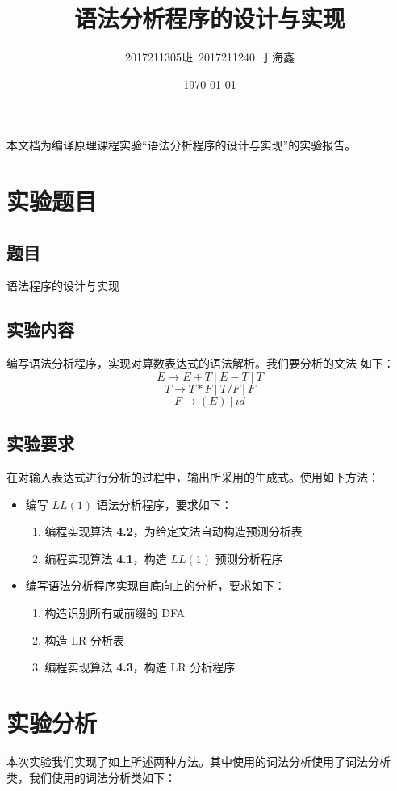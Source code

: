 \documentclass[blue,normal,cn]{elegantnote}
\title{语法分析程序的设计与实现}
\date{\today}
\author{2017211305班\ 2017211240\ 于海鑫}
\begin{document}
\maketitle
本文档为编译原理课程实验``语法分析程序的设计与实现''的实验报告。

\section{实验题目}
\subsection{题目}
语法程序的设计与实现
\subsection{实验内容}
编写语法分析程序，实现对算数表达式的语法解析。我们要分析的文法
如下：
$$
E \to E + T \ |\  E - T\ |\  T
$$
$$
T \to T * F \ |\  T / F\ |\  F
$$
$$
F \to (E) \ |\  id
$$
\subsection{实验要求}
在对输入表达式进行分析的过程中，输出所采用的生成式。使用如下方法：
\begin{itemize}
	\item 编写 $LL(1)$ 语法分析程序，要求如下：
	\begin{enumerate}
		\item 编程实现算法 \textbf{4.2}，为给定文法自动构造预测分析表
		\item 编程实现算法 \textbf{4.1}，构造 $LL(1)$ 预测分析程序
	\end{enumerate}
	\item 编写语法分析程序实现自底向上的分析，要求如下：
	\begin{enumerate}
		\item 构造识别所有或前缀的 DFA
		\item 构造 LR 分析表
		\item 编程实现算法 \textbf{4.3}，构造 LR 分析程序
	\end{enumerate}
\end{itemize}

\section{实验分析}
本次实验我们实现了如上所述两种方法。其中使用的词法分析使用了词法分析
类，我们使用的词法分析类如下：
\end{document}
